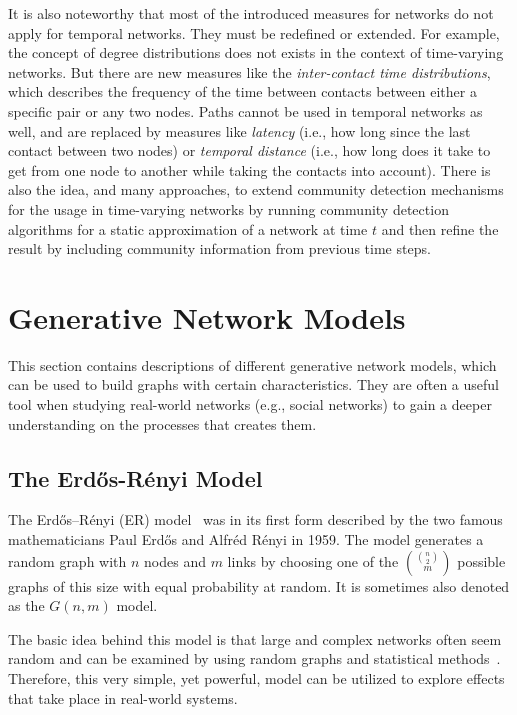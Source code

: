 It is also noteworthy that most of the introduced measures for networks do not apply for temporal networks.
They must be redefined or extended.
For example, the concept of degree distributions does not exists in the context of time-varying networks.
But there are new measures like the \emph{inter-contact time distributions}, which describes the frequency of the time between contacts between either a specific pair or any two nodes.
Paths cannot be used in temporal networks as well, and are replaced by measures like \emph{latency} (i.e., how long since the last contact between two nodes) or \emph{temporal distance} (i.e., how long does it take to get from one node to another while taking the contacts into account).
There is also the idea, and many approaches, to extend community detection mechanisms for the usage in time-varying networks by running community detection algorithms for a static approximation of a network at time \( t \) and then refine the result by including community information from previous time steps.




\section{Generative Network Models}
\label{sec:network-models}

This section contains descriptions of different generative network models, which can be used to build graphs with certain characteristics.
They are often a useful tool when studying real-world networks (e.g., social networks) to gain a deeper understanding on the processes that creates them.


\subsection{The Erdős-Rényi Model}
\label{subsec:erdos-reni-model}

The Erdős–Rényi (ER) model~\cite{Erdos1959, Newman2010} was in its first form described by the two famous mathematicians Paul Erdős and Alfréd Rényi in 1959.
The model generates a random graph with \( n \) nodes and \( m \) links by choosing one of the \( \binom{\binom{n}{2}}{m} \) possible graphs of this size with equal probability at random.
It is sometimes also denoted as the \( G(n, m) \) model.

The basic idea behind this model is that large and complex networks often seem random and can be examined by using random graphs and statistical methods~\cite{Barabasi2002}.
Therefore, this very simple, yet powerful, model can be utilized to explore effects that take place in real-world systems.

